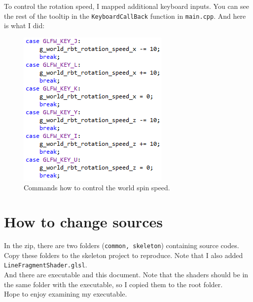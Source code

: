 \documentclass[11pt]{article}
\begin{document}
To control the rotation speed, I mapped additional keyboard inputs. You can see the rest of the tooltip in the \texttt{KeyboardCallBack} function in \texttt{main.cpp}. And here is what I did:
\begin{figure}[htb]
	\begin{center}
		\includegraphics[width=0.5\linewidth]{command2.png}
	\end{center}
	\caption{Commands how to control the world spin speed.}
\end{figure}

\section{How to change sources}
In the zip, there are two folders (\texttt{common, skeleton}) containing source codes. Copy these folders to the skeleton project to reproduce. Note that I also added \texttt{LineFragmentShader.glsl}. \\
And there are executable and this document. Note that the shaders should be in the same folder with the executable, so I copied them to the root folder. \\ Hope to enjoy examining my executable.







\end{document}
